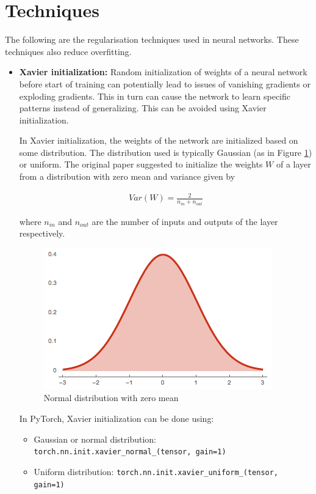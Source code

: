 \section{Techniques}
The following are the regularisation techniques used in neural networks. 
These techniques also reduce overfitting.
\begin{itemize}
    \item[(1)] \textbf{Xavier initialization:} Random initialization of weights of a neural network before start of training can potentially lead to issues of vanishing gradients or exploding gradients. 
    This in turn can cause the network to learn specific patterns instead of generalizing. This can be avoided using Xavier initialization.
    
    In Xavier initialization, the weights of the network are initialized based on some distribution. 
    The distribution used is typically Gaussian (as in Figure \ref{fig:normal_distribution}) or uniform.
    The original paper \cite{glorot2010understanding} suggested to initialize the weights $W$ of a layer from a distribution with zero mean and variance given by
    
    \begin{align}
        Var(W) = \frac{2}{n_{in} + n_{out}}
    \end{align}
    
    where $n_{in}$ and $n_{out}$ are the number of inputs and outputs of the layer respectively.
    
    \begin{figure}
        \centering
        \includegraphics[scale=0.5]{labs/08/images/normal_distribution.png}
        \caption{Normal distribution with zero mean}
        \label{fig:normal_distribution}
    \end{figure}
    
    In PyTorch, Xavier initialization can be done using:
    \begin{itemize}
        \item[(a)] Gaussian or normal distribution: \texttt{torch.nn.init.xavier\_normal\_(tensor, gain=1)}
        \item[(b)] Uniform distribution: \texttt{torch.nn.init.xavier\_uniform\_(tensor, gain=1)}
    \end{itemize}
    

\end{itemize}

